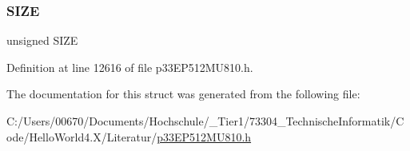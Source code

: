 \subsubsection{\texorpdfstring{S\+I\+ZE}{SIZE}}
{\footnotesize\ttfamily unsigned S\+I\+ZE}



Definition at line 12616 of file p33\+E\+P512\+M\+U810.\+h.



The documentation for this struct was generated from the following file\+:\begin{DoxyCompactItemize}
\item 
C\+:/\+Users/00670/\+Documents/\+Hochschule/\+\_\+\+Tier1/73304\+\_\+\+Technische\+Informatik/\+Code/\+Hello\+World4.\+X/\+Literatur/\hyperlink{p33_e_p512_m_u810_8h}{p33\+E\+P512\+M\+U810.\+h}\end{DoxyCompactItemize}
